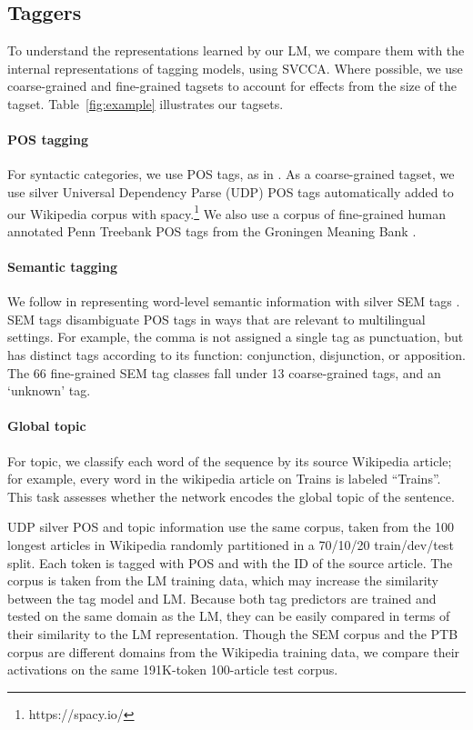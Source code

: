 \subsection{Taggers}

To understand the representations learned by our LM, we compare them with the internal representations of tagging models, using SVCCA. Where possible, we use coarse-grained and fine-grained tagsets to account for effects from the size of the tagset. Table~\ref{fig:example} illustrates our tagsets.

\paragraph{POS tagging}
For syntactic categories, we use POS tags, as in \citeauthor{belinkov_what_2017}. As a coarse-grained tagset, we use silver Universal Dependency Parse (UDP) POS tags automatically added to our Wikipedia corpus with spacy.\footnote{https://spacy.io/} We also use a corpus of fine-grained human annotated Penn Treebank POS tags from the Groningen Meaning Bank \cite[GMB]{bos2017groningen}.

\paragraph{Semantic tagging} We follow \citeauthor{belinkov_evaluating_2018} in representing word-level semantic information with silver SEM tags \cite{bjerva_semantic_2016}. SEM tags disambiguate POS tags in ways that are relevant to multilingual settings. For example, the comma is not assigned a single tag as punctuation, but has distinct tags according to its function: conjunction, disjunction, or apposition. The 66 fine-grained SEM tag classes fall under 13 coarse-grained tags, and an `unknown' tag.

\paragraph{Global topic} For topic, we classify each word of the  sequence by its source Wikipedia article; for example, every word in the wikipedia article on Trains is labeled ``Trains''. This task assesses whether the network encodes the global topic of the sentence. 

UDP silver POS and topic information use the same corpus, taken from the 100 longest articles in Wikipedia randomly partitioned in a 70/10/20 train/dev/test split.   Each token is tagged with POS and with the ID of the source article. The corpus is taken from the LM training data, which may increase the similarity between the tag model and LM. Because both tag predictors are trained and tested on the same domain as the LM, they can be easily compared in terms of their similarity to the LM representation. Though the SEM corpus and the PTB corpus are different domains from the Wikipedia training data, we compare their activations on the same 191K-token 100-article test corpus. 

